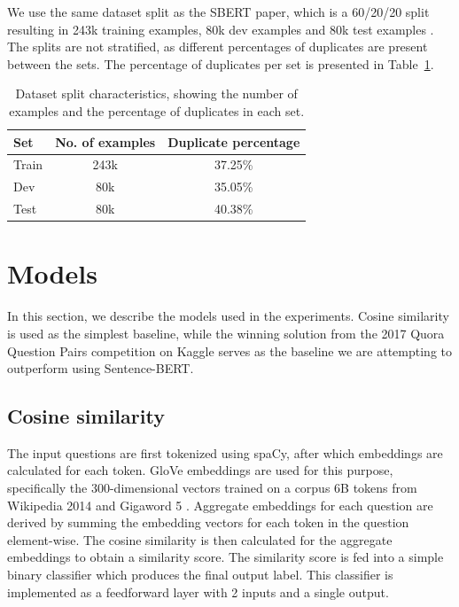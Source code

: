 \documentclass[10pt, a4paper]{article}
\begin{document}
We use the same dataset split as the SBERT paper, which is a 60/20/20 split resulting in 243k training examples, 80k dev examples and 80k test examples \citep{reimers-2019-sentence-bert}.
The splits are not stratified, as different percentages of duplicates are present between the sets. The percentage of duplicates per set is presented in Table~\ref{tab:duplicate-percentages}.

\begin{table}
\caption{Dataset split characteristics, showing the number of examples and the percentage of duplicates in each set.}
\label{tab:duplicate-percentages}
\begin{center}
\begin{tabular}{lcc}
\toprule
\textbf{Set} & \textbf{No. of examples} & \textbf{Duplicate percentage} \\
\midrule
Train & 243k & 37.25\% \\
Dev   & 80k  & 35.05\% \\
Test  & 80k  & 40.38\% \\
\bottomrule
\end{tabular}
\end{center}
\end{table}

\section{Models} \label{models}

In this section, we describe the models used in the experiments.
Cosine similarity is used as the simplest baseline, while the winning solution from the 2017 Quora Question Pairs competition on Kaggle serves as the baseline we are attempting to outperform using Sentence-BERT.

\subsection{Cosine similarity} \label{cosine-similarity}

The input questions are first tokenized using spaCy, after which embeddings are calculated for each token.
GloVe embeddings are used for this purpose, specifically the 300-dimensional vectors trained on a corpus 6B tokens from Wikipedia 2014 and Gigaword 5 \citep{pennington2014glove}.
Aggregate embeddings for each question are derived by summing the embedding vectors for each token in the question element-wise.
The cosine similarity is then calculated for the aggregate embeddings to obtain a similarity score.
The similarity score is fed into a simple binary classifier which produces the final output label.
This classifier is implemented as a feedforward layer with 2 inputs and a single output.
\end{document}
